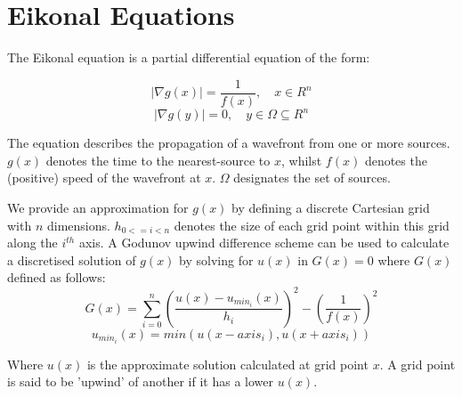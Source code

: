 \documentclass[11pt]{article}       %
\begin{document}
\section{Eikonal Equations} \label{sec:eikonal}

The Eikonal equation is a partial differential equation of the form:

\begin{equation}
|\nabla g(x)| = \frac{1}{f(x)}, \quad x \in R^n
\end{equation}
\begin{equation*}
|\nabla g(y)| = 0			  , \quad y \in \Omega \subseteq R^n
\end{equation*}

The equation describes the propagation of a wavefront from one or more sources. $g(x)$ denotes the time to the nearest-source to $x$, whilst $f(x)$ denotes the (positive) speed of the wavefront at $x$. $\Omega$ designates the set of sources.

We provide an approximation for $g(x)$ by defining a discrete Cartesian grid with $n$ dimensions. $h_{0 <= i < n}$ denotes the size of each grid point within this grid along the $i^{th}$ axis. A Godunov upwind difference scheme can be used to calculate a discretised solution of $g(x)$ by solving for $u(x)$ in $G(x) = 0$ where $G(x)$ defined as follows:\cite{zhao2005fast}
\begin{equation}\label{eq:godunov_first_order_discrete}
G(x) = \sum_{i=0}^{n}{(\frac{u(x) - u_{min_{i}}(x)}{h_i})^2} - (\frac{1}{f(x)})^2
\end{equation}
\begin{equation*}
u_{min_i}(x) = min(u(x - axis_i), u(x + axis_i))
\end{equation*}

Where $u(x)$ is the approximate solution calculated at grid point $x$. A grid point is said to be 'upwind' of another if it has a lower $u(x)$.

\end{document}
